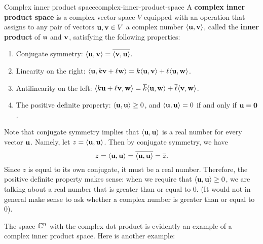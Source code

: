 \begin{definition}{Complex inner product space}{complex-inner-product-space}
  A \textbf{complex inner product space}%
   is a
  complex vector space $V$ equipped with an operation that assigns to
  any pair of vectors $\vect{u},\vect{v}\in V$ a complex number
  $\iprod{\vect{u},\vect{v}}$, called the \textbf{inner product}%
   of $\vect{u}$ and $\vect{v}$,
  satisfying the following properties:
  \begin{enumerate}
  \item Conjugate symmetry:%
    $\iprod{\vect{u},\vect{v}} =
    \conjugate{\iprod{\vect{v},\vect{u}}}$.
  \item Linearity on the right:%
    $\iprod{\vect{u},k\vect{v}+\ell\vect{w}}
    =k\iprod{\vect{u}, \vect{v}}+\ell\iprod{\vect{u},\vect{w}}$.
  \item Antilinearity on the left:%
    $\iprod{k\vect{u}+\ell\vect{v},\vect{w}}=\conjugate{k}\iprod{\vect{u},\vect{w}}+\conjugate{\ell}\iprod{\vect{v},\vect{w}}$.
  \item The positive definite property:%
    $\iprod{\vect{u},\vect{u}} \geq 0$, and
    $\iprod{\vect{u},\vect{u}}=0$ if and only if
    $\vect{u} = \vect{0}$.
  \end{enumerate}
\end{definition}

Note that conjugate symmetry implies that $\iprod{\vect{u},\vect{u}}$
is a real number for every vector $\vect{u}$. Namely, let
$z=\iprod{\vect{u},\vect{u}}$. Then by conjugate symmetry, we have
\begin{equation*}
  z
  = \iprod{\vect{u},\vect{u}}
  = \conjugate{\iprod{\vect{u},\vect{u}}}
  = \conjugate{z}.
\end{equation*}
Since $z$ is equal to its own conjugate, it must be a real
number. Therefore, the positive definite property makes sense: when we
require that $\iprod{\vect{u},\vect{u}} \geq 0$, we are talking about
a real number that is greater than or equal to $0$. (It would not in
general make sense to ask whether a complex number is  greater than or
equal to $0$).

The space $\mathbb{C}^n$ with the complex dot product is evidently an example
of a complex inner product space. Here is another example:


